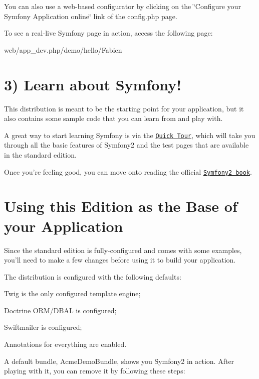 You can also use a web-\/based configurator by clicking on the \char`\"{}\-Configure your
\-Symfony Application online\char`\"{} link of the {\ttfamily config.\-php} page.

To see a real-\/live Symfony page in action, access the following page\-: \begin{DoxyVerb}web/app_dev.php/demo/hello/Fabien
\end{DoxyVerb}


\section*{3) Learn about Symfony!}

This distribution is meant to be the starting point for your application, but it also contains some sample code that you can learn from and play with.

A great way to start learning Symfony is via the \href{http://symfony.com/doc/current/quick_tour/the_big_picture.html}{\tt Quick Tour}, which will take you through all the basic features of Symfony2 and the test pages that are available in the standard edition.

Once you're feeling good, you can move onto reading the official \href{http://symfony.com/doc/current/}{\tt Symfony2 book}.

\section*{Using this Edition as the Base of your Application}

Since the standard edition is fully-\/configured and comes with some examples, you'll need to make a few changes before using it to build your application.

The distribution is configured with the following defaults\-:


\begin{DoxyItemize}
\item Twig is the only configured template engine;
\item Doctrine O\-R\-M/\-D\-B\-A\-L is configured;
\item Swiftmailer is configured;
\item Annotations for everything are enabled.
\end{DoxyItemize}

A default bundle, {\ttfamily Acme\-Demo\-Bundle}, shows you Symfony2 in action. After playing with it, you can remove it by following these steps\-:


